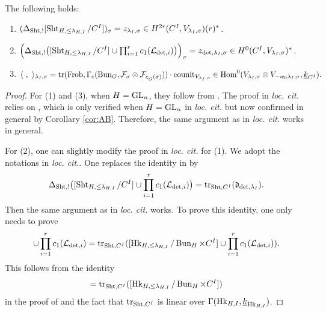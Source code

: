\documentclass[reqno]{amsart}
\numberwithin{equation}{section}
\numberwithin{equation}{section}
\begin{document}
\begin{prop}\label{prop:cycle=trace}
    The following holds:
    \begin{enumerate}
        \item $(\Delta_{\operatorname{Sht},!}[\operatorname{Sht}_{H,\leq\lambda_{H,I}}/C^I])_{\sigma} = z_{\lambda_I,\sigma}\in H^{2r}(C^I,V_{\lambda_I,\sigma})(r)^*$.
        \item $\Bigl(\Delta_{\operatorname{Sht},!}\bigl([\operatorname{Sht}_{H,\leq\lambda_{H,I}}/C^I]\cup \prod_{i=1}^r c_1(\mathcal{L}_{\det,i})\bigr)\Bigr)_{\sigma} = z_{\det,\lambda_I,\sigma}\in H^0(C^I, V_{\lambda_I,\sigma})^*$.
        \item $\langle~,~\rangle_{\lambda_I,\sigma}=\operatorname{tr}(\operatorname{Frob}, \Gamma_c(\operatorname{Bun}_G,\mathcal{F}_{\sigma}\otimes \mathcal{F}_{c_{\check{G}}(\sigma)}))\cdot \mathrm{counit}_{V_{\lambda_I,\sigma}}\in \operatorname{Hom}^0(V_{\lambda_I,\sigma}\otimes V_{-w_0\lambda_I,\sigma}, \underline{k}_{C^I}).$
    \end{enumerate}
\end{prop}

\begin{proof}
    For (1) and (3), when $H=\operatorname{GL}_n$, they follow from \cite[Proposition\,6.11]{wang2025specialcycleshtukascategorical}. The proof in \textit{loc. cit.} relies on \cite[Assumption\,5.13]{wang2025specialcycleshtukascategorical}, which is only verified when $H=\operatorname{GL}_n$ in \textit{loc. cit.} but now confirmed in general by Corollary \ref{cor:AB}. Therefore, the same argument as in \textit{loc. cit.} works in general.

    For (2), one can slightly modify the proof in \textit{loc. cit.} for (1). We adopt the notations in \textit{loc. cit.}. One replaces the identity in \cite[Proposition\,6.11, Theorem\,3.3]{wang2025specialcycleshtukascategorical} by \begin{equation}
    \Delta_{\operatorname{Sht},!}\bigl([\operatorname{Sht}_{H,\leq\lambda_{H,I}}/C^I]\cup \prod_{i=1}^r c_1(\mathcal{L}_{\det,i})\bigr)=\operatorname{tr}_{\operatorname{Sht},C^I}(\mathfrak{d}_{\det,\lambda_I}).
\end{equation} Then the same argument as in \textit{loc. cit.} works. To prove this identity, one only needs to prove \begin{equation}
[\Sht_{H,\leq\lambda_{H,I}}/C^I]\cup \prod_{i=1}^r c_1(\cL_{\det,i})=\tr_{\Sht,C^I}([\Hk_{H,\leq\lambda_{H,I}}/\Bun_H\times C^I]\cup \prod_{i=1}^r c_1(\cL_{\det,i})).
\end{equation} This follows from the identity \begin{equation}
[\Sht_{H,\leq\lambda_{H,I}}/C^I]=\tr_{\Sht,C^I}([\Hk_{H,\leq\lambda_{H,I}}/\Bun_H\times C^I])
\end{equation} in the proof of \cite[Theorem\,3.3]{wang2025specialcycleshtukascategorical} and the fact that $\operatorname{tr}_{\operatorname{Sht},C^I}$ is linear over $\Gamma(\operatorname{Hk}_{H,I},\underline{k}_{\operatorname{Hk}_{H,I}})$.

\end{proof}
\end{document}
